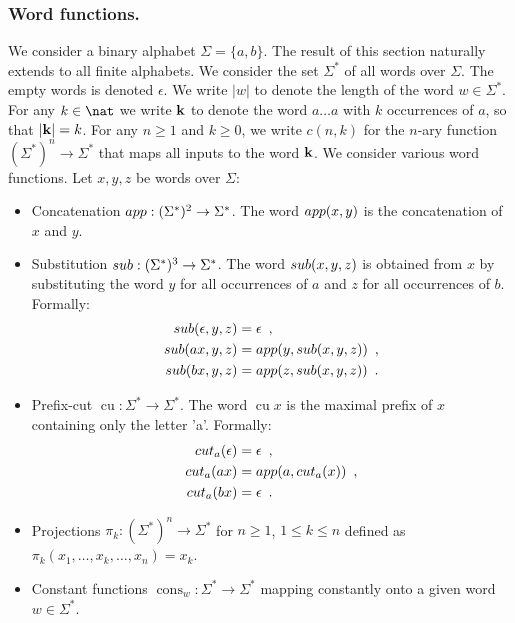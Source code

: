 \subsubsection*{Word functions.}  We consider a binary alphabet $\Sigma = \{a,b\}$. The result of this section naturally extends to all finite alphabets. We consider the set $\Sigma^*$ of all words over
$\Sigma$. The empty words is denoted $\epsilon$. We write $|w|$ to
denote the length of the word $w\in\Sigma^*$. For any $k\in \nat$ we
write $\mathbf{k}$ to denote the word $a \ldots a$ with $k$
occurrences of $a$, so that $|\mathbf{k}| = k$. For any $n\geq 1$
and $k\geq 0$, we write $c(n,k)$ for the $n$-ary function
$(\Sigma^*)^n \rightarrow \Sigma^*$ that maps all inputs to the word
$\mathbf{k}$. We consider various word functions. Let $x,y,z$ be words over $\Sigma$:
\begin{itemize}
\item Concatenation $\mathop{app} : (\Sigma^*)^2 \rightarrow
\Sigma^*$. The word $\mathop{app}(x,y)$ is the concatenation of $x$ and $y$. 
\item Substitution $\mathop{sub} : (\Sigma^*)^3 \rightarrow \Sigma^*$. The word $\mathop{sub}(x,y,z)$ is obtained from $x$ by substituting the word $y$ for all occurrences of $a$ and $z$ for all
occurrences of $b$. Formally:
\begin{align*}
  \mathop{sub}(\epsilon, y, z) &= \epsilon\enspace, \\
  \mathop{sub}(ax, y, z) &= \mathop{app}(y,\mathop{sub}(x,y,z))\enspace, \\
  \mathop{sub}(bx, y, z) &= \mathop{app}(z,\mathop{sub}(x,y,z))\enspace .
\end{align*}

\item Prefix-cut $\mathop{cut_a} : \Sigma^* \rightarrow
\Sigma^*$. The word $\mathop{cut_a} x$ is the maximal prefix of $x$ containing only the letter 'a'. Formally:
\begin{align*}
  \mathop{cut_a}(\epsilon) &= \epsilon\enspace, \\
  \mathop{cut_a}(ax) &= \mathop{app}(a,\mathop{cut_a}(x))\enspace, \\
  \mathop{cut_a}(bx) &= \epsilon\enspace .
\end{align*}
  \item Projections $\pi_k : (\Sigma^*)^n \rightarrow
\Sigma^*$ for $n\geq 1$, $1\leq k \leq n$ defined as $\pi_k(x_1,\ldots,x_k,\ldots,x_n) = x_k$.
  \item Constant functions $\mathop{cons}_w : \Sigma^* \rightarrow
\Sigma^*$ mapping constantly onto a given word $w \in \Sigma^*$.
\end{itemize}
